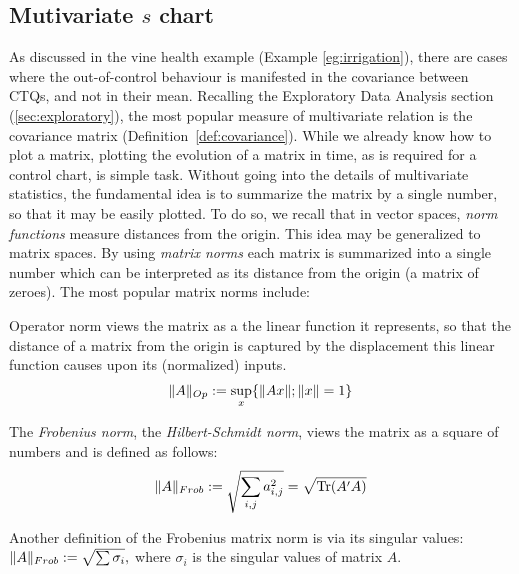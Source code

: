 \subsection{Mutivariate $s$ chart}
\label{sec:multivarite_s}

As discussed in the vine health example (Example \ref{eg:irrigation}), there are cases where the out-of-control behaviour is manifested in the covariance between CTQs, and not in their mean.
Recalling the Exploratory Data Analysis section (\ref{sec:exploratory}), the most popular measure of multivariate relation is the covariance matrix (Definition~\ref{def:covariance}).
While we already know how to plot a matrix, plotting the evolution of a matrix in time, as is required for a control chart, is simple task. 
Without going into the details of multivariate statistics, the fundamental idea is to summarize the matrix by a single number, so that it may be easily plotted. 
To do so, we recall that in vector spaces, \emph{norm functions} measure distances from the origin.
This idea may be generalized to matrix spaces. By using \emph{matrix norms} each matrix is summarized into a single number which can be interpreted as its distance from the origin (a matrix of zeroes).
The most popular matrix norms include:

\begin{definition}
Operator norm views the matrix as a the linear function it represents, so that the distance of a matrix from the origin is captured by the displacement this linear function causes upon its (normalized) inputs.
\begin{align}
	\Vert A \Vert_{Op}:= \sup_x \{ \Vert Ax \Vert; \Vert x \Vert=1 \}
\end{align}
\end{definition}


\begin{definition}
The \emph{Frobenius norm}, \aka the \emph{Hilbert-Schmidt norm}, views the matrix as a square of numbers and is defined as follows:
\begin{align}
	\Vert A \Vert_{Frob}:= \sqrt{\sum_{i,j} a_{i,j}^2} = \sqrt{\operatorname{Tr}(A'A)}
\end{align}
\end{definition}

\begin{extra}
Another definition of the Frobenius matrix norm is via its singular values:
$ 	\Vert A \Vert_{Frob}:= \sqrt{\sum \sigma_i}, $
where $\sigma_i$ is the singular values of matrix $A$.
\end{extra}


